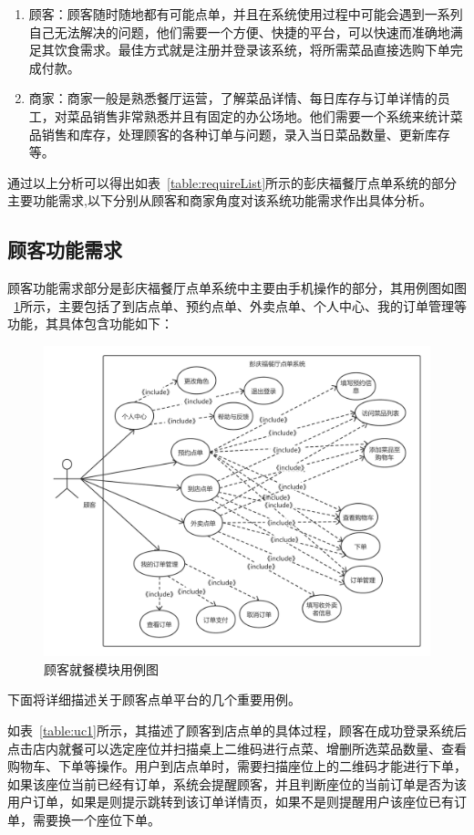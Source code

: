 \begin{enumerate}
    \item 顾客：顾客随时随地都有可能点单，并且在系统使用过程中可能会遇到一系列自己无法解决的问题，他们需要一个方便、快捷的平台，可以快速而准确地满足其饮食需求。最佳方式就是注册并登录该系统，将所需菜品直接选购下单完成付款。
    \item 商家：商家一般是熟悉餐厅运营，了解菜品详情、每日库存与订单详情的员工，对菜品销售非常熟悉并且有固定的办公场地。他们需要一个系统来统计菜品销售和库存，处理顾客的各种订单与问题，录入当日菜品数量、更新库存等。
  \end{enumerate}

通过以上分析可以得出如表~\ref{table:requireList}所示的彭庆福餐厅点单系统的部分主要功能需求,以下分别从顾客和商家角度对该系统功能需求作出具体分析。\\

\subsection{顾客功能需求}
顾客功能需求部分是彭庆福餐厅点单系统中主要由手机操作的部分，其用例图如图
~\ref{fig_customerCH3}所示，主要包括了到店点单、预约点单、外卖点单、个人中心、我的订单管理等功能，其具体包含功能如下：
\begin{figure}[htbp!]
  \centering
  \includegraphics[width=5in]{FIGs/chapter3/customer.pdf}
  \caption{顾客就餐模块用例图}\label{fig_customerCH3}
\end{figure}

下面将详细描述关于顾客点单平台的几个重要用例。

如表~\ref{table:uc1}所示，其描述了顾客到店点单的具体过程，顾客在成功登录系统后点击店内就餐可以选定座位并扫描桌上二维码进行点菜、增删所选菜品数量、查看购物车、下单等操作。用户到店点单时，需要扫描座位上的二维码才能进行下单，如果该座位当前已经有订单，系统会提醒顾客，并且判断座位的当前订单是否为该用户订单，如果是则提示跳转到该订单详情页，如果不是则提醒用户该座位已有订单，需要换一个座位下单。

